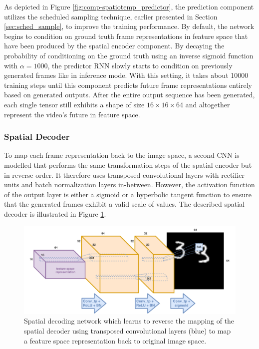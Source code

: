 As depicted in Figure \ref{fig:comp-spatiotemp_predictor}, the prediction component utilizes the scheduled sampling technique, earlier presented in Section \ref{sec:sched_sample}, to improve the training performance. By default, the network begins to condition on ground truth frame representations in feature space that have been produced by the spatial encoder component. By decaying the probability of conditioning on the ground truth using an inverse sigmoid function with $\alpha = 1000$, the predictor RNN slowly starts to condition on previously generated frames like in inference mode. With this setting, it takes about \num{10000} training steps until this component predicts future frame representations entirely based on generated outputs. After the entire output sequence has been generated, each single tensor still exhibits a shape of size $16\times16\times64$ and altogether represent the video's future in feature space.

\subsubsection{Spatial Decoder}

To map each frame representation back to the image space, a second CNN is modelled that performs the same transformation steps of the spatial encoder but in reverse order. It therefore uses transposed convolutional layers with rectifier units and batch normalization layers in-between. However, the activation function of the output layer is either a sigmoid or a hyperbolic tangent function to ensure that the generated frames exhibit a valid scale of values. The described spatial decoder is illustrated in Figure \ref{fig:comp-spatial_decoder}.

\begin{figure}[htb]
	\centering
	\includegraphics[width=0.9\linewidth]{figures/comp_spatial_decoder.pdf} 
	\caption[Spatial Decoder Component]{Spatial decoding network which learns to reverse the mapping of the spatial decoder using transposed convolutional layers (blue) to map a feature space representation back to original image space.} \label{fig:comp-spatial_decoder}
\end{figure}


